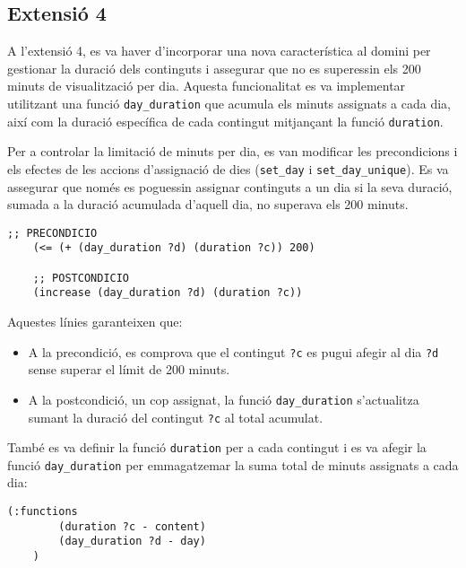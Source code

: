 \documentclass[a4paper]{article}
\begin{document}
	\subsection{Extensió 4}
	
	A l'extensió 4, es va haver d'incorporar una nova característica al domini per gestionar la duració dels continguts i assegurar que no es superessin els 200 minuts de visualització per dia. Aquesta funcionalitat es va implementar utilitzant una funció \texttt{day\_duration} que acumula els minuts assignats a cada dia, així com la duració específica de cada contingut mitjançant la funció \texttt{duration}.
	
	Per a controlar la limitació de minuts per dia, es van modificar les precondicions i els efectes de les accions d'assignació de dies (\texttt{set\_day} i \texttt{set\_day\_unique}). Es va assegurar que només es poguessin assignar continguts a un dia si la seva duració, sumada a la duració acumulada d'aquell dia, no superava els 200 minuts.
	
	\begin{lstlisting}[language=PDDL, caption={Restriccions per controlar el límit de 200 minuts per dia}, label={lst:extensio4}]
	;; PRECONDICIO
	(<= (+ (day_duration ?d) (duration ?c)) 200)
	
	;; POSTCONDICIO
	(increase (day_duration ?d) (duration ?c))
	\end{lstlisting}
	
	Aquestes línies garanteixen que:
	\begin{itemize}
		\item A la precondició, es comprova que el contingut \texttt{?c} es pugui afegir al dia \texttt{?d} sense superar el límit de 200 minuts.
		\item A la postcondició, un cop assignat, la funció \texttt{day\_duration} s'actualitza sumant la duració del contingut \texttt{?c} al total acumulat.
	\end{itemize}
	
	També es va definir la funció \texttt{duration} per a cada contingut i es va afegir la funció \texttt{day\_duration} per emmagatzemar la suma total de minuts assignats a cada dia:
	\begin{lstlisting}[language=PDDL, caption={Funcions per l'extensió 4}, label={lst:funcionsExtensio4}]
	(:functions
		(duration ?c - content)
		(day_duration ?d - day)
	)
	\end{lstlisting}
	
\end{document}
